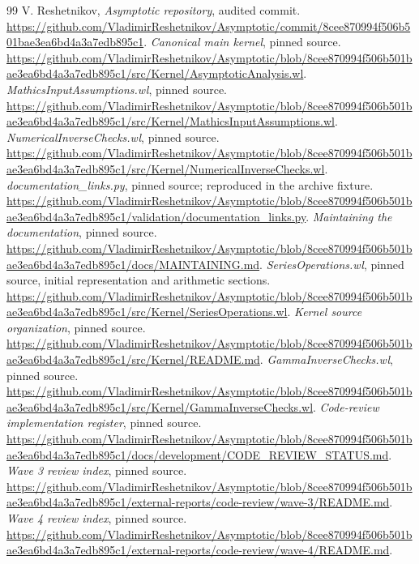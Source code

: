 \documentclass[11pt,letterpaper]{article}
\begin{document}
\clearpage
\begin{thebibliography}{99}
\small
\setlength{\parskip}{0pt}
\setlength{\itemsep}{3pt}
 V. Reshetnikov, \emph{Asymptotic repository}, audited commit.
\url{https://github.com/VladimirReshetnikov/Asymptotic/commit/8cee870994f506b501bae3ea6bd4a3a7edb895c1}.
 \emph{Canonical main kernel}, pinned source.
\url{https://github.com/VladimirReshetnikov/Asymptotic/blob/8cee870994f506b501bae3ea6bd4a3a7edb895c1/src/Kernel/AsymptoticAnalysis.wl}.
 \emph{MathicsInputAssumptions.wl}, pinned source.
\url{https://github.com/VladimirReshetnikov/Asymptotic/blob/8cee870994f506b501bae3ea6bd4a3a7edb895c1/src/Kernel/MathicsInputAssumptions.wl}.
 \emph{NumericalInverseChecks.wl}, pinned source.
\url{https://github.com/VladimirReshetnikov/Asymptotic/blob/8cee870994f506b501bae3ea6bd4a3a7edb895c1/src/Kernel/NumericalInverseChecks.wl}.
 \emph{documentation\_links.py}, pinned source; reproduced in the archive fixture.
\url{https://github.com/VladimirReshetnikov/Asymptotic/blob/8cee870994f506b501bae3ea6bd4a3a7edb895c1/validation/documentation_links.py}.
 \emph{Maintaining the documentation}, pinned source.
\url{https://github.com/VladimirReshetnikov/Asymptotic/blob/8cee870994f506b501bae3ea6bd4a3a7edb895c1/docs/MAINTAINING.md}.
 \emph{SeriesOperations.wl}, pinned source, initial representation and arithmetic sections.
\url{https://github.com/VladimirReshetnikov/Asymptotic/blob/8cee870994f506b501bae3ea6bd4a3a7edb895c1/src/Kernel/SeriesOperations.wl}.
 \emph{Kernel source organization}, pinned source.
\url{https://github.com/VladimirReshetnikov/Asymptotic/blob/8cee870994f506b501bae3ea6bd4a3a7edb895c1/src/Kernel/README.md}.
 \emph{GammaInverseChecks.wl}, pinned source.
\url{https://github.com/VladimirReshetnikov/Asymptotic/blob/8cee870994f506b501bae3ea6bd4a3a7edb895c1/src/Kernel/GammaInverseChecks.wl}.
 \emph{Code-review implementation register}, pinned source.
\url{https://github.com/VladimirReshetnikov/Asymptotic/blob/8cee870994f506b501bae3ea6bd4a3a7edb895c1/docs/development/CODE_REVIEW_STATUS.md}.
 \emph{Wave 3 review index}, pinned source.
\url{https://github.com/VladimirReshetnikov/Asymptotic/blob/8cee870994f506b501bae3ea6bd4a3a7edb895c1/external-reports/code-review/wave-3/README.md}.
 \emph{Wave 4 review index}, pinned source.
\url{https://github.com/VladimirReshetnikov/Asymptotic/blob/8cee870994f506b501bae3ea6bd4a3a7edb895c1/external-reports/code-review/wave-4/README.md}.

\end{thebibliography}
\end{document}
